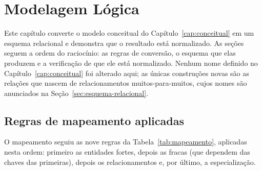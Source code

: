\documentclass[a4paper,12pt,oneside,openany]{book}
\newif\iforientacoes
\newcommand{\orientacao}[1]{%
    \iforientacoes
        \begin{quote}
        \small\itshape\textbf{Orientação:} #1
        \end{quote}
    \fi
}
\begin{document}
\chapter{Modelagem Lógica}\label{cap:logica}

Este capítulo converte o modelo conceitual do Capítulo~\ref{cap:conceitual} em um
esquema relacional e demonstra que o resultado está normalizado. As seções seguem a
ordem do raciocínio: as regras de conversão, o esquema que elas produzem e a
verificação de que ele está normalizado. Nenhum nome definido no
Capítulo~\ref{cap:conceitual} foi alterado aqui; as únicas construções novas são as
relações que nascem de relacionamentos muitos-para-muitos, cujos nomes são anunciados
na Seção~\ref{sec:esquema-relacional}.

\section{Regras de mapeamento aplicadas}\label{sec:mapeamento}

\orientacao{Enunciem cada regra de conversão do modelo ER para o relacional e
mostrem onde ela foi aplicada. Não basta apresentar o esquema pronto: o professor
avalia o \emph{processo} de mapeamento (item 6.1 do conteúdo). A tabela abaixo já
está organizada por tipo de construção; preencham a coluna da direita.}

O mapeamento seguiu as nove regras da Tabela~\ref{tab:mapeamento}, aplicadas nesta
ordem: primeiro as entidades fortes, depois as fracas (que dependem das chaves das
primeiras), depois os relacionamentos e, por último, a especialização.
\end{document}
